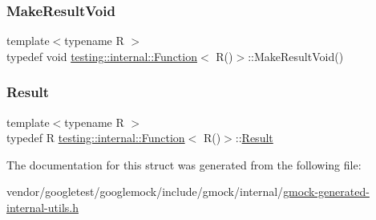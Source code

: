 \subsubsection{\texorpdfstring{Make\+Result\+Void}{MakeResultVoid}}
{\footnotesize\ttfamily template$<$typename R $>$ \\
typedef void \hyperlink{structtesting_1_1internal_1_1_function}{testing\+::internal\+::\+Function}$<$ R()$>$\+::Make\+Result\+Void()}

\mbox{\label{structtesting_1_1internal_1_1_function_3_01_r_07_08_4_a5c228a886ef598ac10988f8de5e32ca1}} 
\subsubsection{\texorpdfstring{Result}{Result}}
{\footnotesize\ttfamily template$<$typename R $>$ \\
typedef R \hyperlink{structtesting_1_1internal_1_1_function}{testing\+::internal\+::\+Function}$<$ R()$>$\+::\hyperlink{structtesting_1_1internal_1_1_function_3_01_r_07_08_4_a5c228a886ef598ac10988f8de5e32ca1}{Result}}



The documentation for this struct was generated from the following file\+:\begin{DoxyCompactItemize}
\item 
vendor/googletest/googlemock/include/gmock/internal/\hyperlink{gmock-generated-internal-utils_8h}{gmock-\/generated-\/internal-\/utils.\+h}\end{DoxyCompactItemize}
